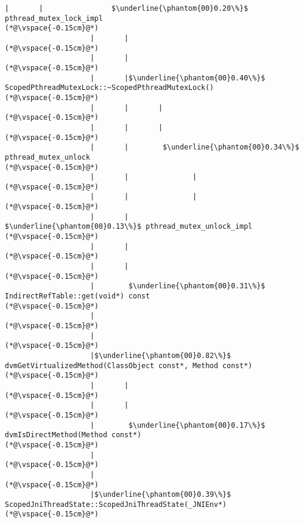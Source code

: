 \begin{lstlisting}[caption=Metodikutsu C$\to$Java 20 viiteparametrilla, label=profile:C2JBenchmark00206, numberbychapter=true, frame=lines, float, floatplacement=t]
                    |       |                $\underline{\phantom{00}0.20\%}$ pthread_mutex_lock_impl
(*@\vspace{-0.15cm}@*)
                    |       |
(*@\vspace{-0.15cm}@*)
                    |       |
(*@\vspace{-0.15cm}@*)
                    |       |$\underline{\phantom{00}0.40\%}$ ScopedPthreadMutexLock::~ScopedPthreadMutexLock()
(*@\vspace{-0.15cm}@*)
                    |       |       |
(*@\vspace{-0.15cm}@*)
                    |       |       |
(*@\vspace{-0.15cm}@*)
                    |       |        $\underline{\phantom{00}0.34\%}$ pthread_mutex_unlock
(*@\vspace{-0.15cm}@*)
                    |       |               |
(*@\vspace{-0.15cm}@*)
                    |       |               |
(*@\vspace{-0.15cm}@*)
                    |       |                $\underline{\phantom{00}0.13\%}$ pthread_mutex_unlock_impl
(*@\vspace{-0.15cm}@*)
                    |       |
(*@\vspace{-0.15cm}@*)
                    |       |
(*@\vspace{-0.15cm}@*)
                    |        $\underline{\phantom{00}0.31\%}$ IndirectRefTable::get(void*) const
(*@\vspace{-0.15cm}@*)
                    |
(*@\vspace{-0.15cm}@*)
                    |
(*@\vspace{-0.15cm}@*)
                    |$\underline{\phantom{00}0.82\%}$ dvmGetVirtualizedMethod(ClassObject const*, Method const*)
(*@\vspace{-0.15cm}@*)
                    |       |
(*@\vspace{-0.15cm}@*)
                    |       |
(*@\vspace{-0.15cm}@*)
                    |        $\underline{\phantom{00}0.17\%}$ dvmIsDirectMethod(Method const*)
(*@\vspace{-0.15cm}@*)
                    |
(*@\vspace{-0.15cm}@*)
                    |
(*@\vspace{-0.15cm}@*)
                    |$\underline{\phantom{00}0.39\%}$ ScopedJniThreadState::ScopedJniThreadState(_JNIEnv*)
(*@\vspace{-0.15cm}@*)

\end{lstlisting}
